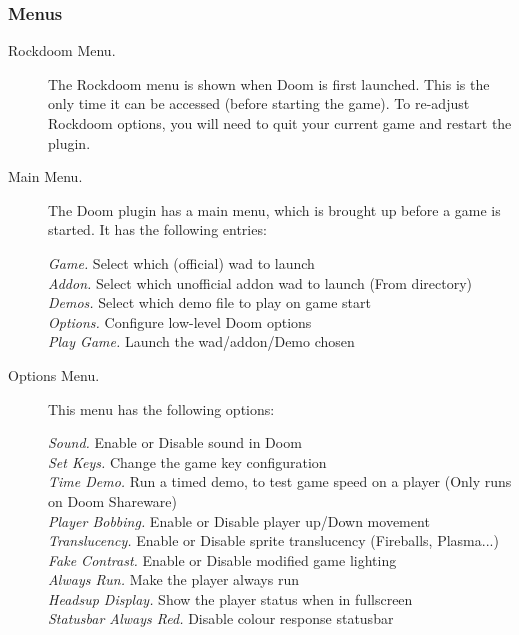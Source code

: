 \subsubsection{Menus}
\begin{description}
  \item[Rockdoom Menu. ] The Rockdoom menu is shown when Doom is first launched.  
This is the only time it can be accessed (before starting the game).  To re-adjust 
Rockdoom options, you will need to quit your current game and restart the plugin.
  \item[Main Menu. ]
  The Doom plugin has a main menu, which is brought up before a game is started. It 
  has the following entries:
  
  \emph{Game. } Select which (official) wad to launch\\
  \emph{Addon. } Select which unofficial addon wad to launch (From 
   directory)\\
  \emph{Demos. } Select which demo file to play on game start\\
  \emph{Options. } Configure low-level Doom options\\
  \emph{Play Game. } Launch the wad/addon/Demo chosen%

  
  \item[Options Menu. ]This menu has the following options:
  
  \emph{Sound. } Enable or Disable sound in Doom\\
  \emph{Set Keys. }  Change the game key configuration\\
  \emph{Time Demo. } Run a timed demo, to test game speed on a player (Only runs on Doom Shareware)\\
  \emph{Player Bobbing. } Enable or Disable player up/Down movement\\
  \emph{Translucency. } Enable or Disable sprite translucency (Fireballs, Plasma...)\\
  \emph{Fake Contrast.} Enable or Disable modified game lighting\\
  \emph{Always Run.} Make the player always run\\
  \emph{Headsup Display.} Show the player status when in fullscreen\\
  \emph{Statusbar Always Red.} Disable colour response statusbar%


\end{description}
